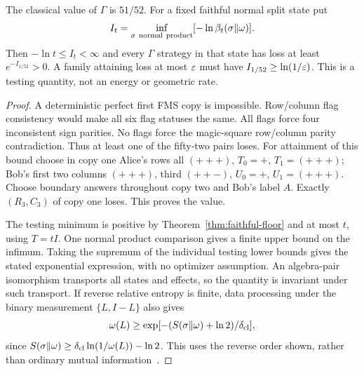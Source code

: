 \begin{proposition}\label{prop:testing-price}
The classical value of $\Gamma$ is $51/52$. For a fixed faithful normal split state put
\[
 I_t=\inf_{\sigma\ {\rm normal\ product}}[-\ln\beta_t(\sigma\Vert\omega)].
\]
Then $-\ln t\le I_t<\infty$ and every $\Gamma$ strategy in that state has loss at least $e^{-I_{1/52}}>0$. A family attaining loss at most $\varepsilon$ must have $I_{1/52}\ge\ln(1/\varepsilon)$. This is a testing quantity, not an energy or geometric rate.
\end{proposition}
\begin{proof}
A deterministic perfect first FMS copy is impossible. Row/column flag consistency would make all six flag statuses the same. All flags force four inconsistent sign parities. No flags force the magic-square row/column parity contradiction. Thus at least one of the fifty-two pairs loses. For attainment of this bound choose in copy one Alice's rows all $(+++)$, $T_0=+$, $T_1=(+++)$; Bob's first two columns $(+++)$, third $(++-)$, $U_0=+$, $U_1=(+++)$. Choose boundary answers throughout copy two and Bob's label $A$. Exactly $(R_3,C_3)$ of copy one loses. This proves the value.

The testing minimum is positive by Theorem~\ref{thm:faithful-floor} and at most $t$, using $T=tI$. One normal product comparison gives a finite upper bound on the infimum. Taking the supremum of the individual testing lower bounds gives the stated exponential expression, with no optimizer assumption. An algebra-pair isomorphism transports all states and effects, so the quantity is invariant under such transport. If reverse relative entropy is finite, data processing under the binary measurement $\{L,I-L\}$ also gives
\[
 \omega(L)\ge\exp[-(S(\sigma\Vert\omega)+\ln2)/\delta_{\rm cl}],
\]
since $S(\sigma\Vert\omega)\ge\delta_{\rm cl}\ln(1/\omega(L))-\ln2$. This uses the reverse order shown, rather than ordinary mutual information~\cite{Araki}.
\end{proof}


